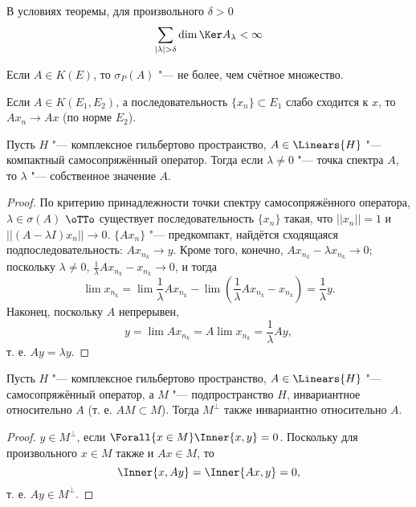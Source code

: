 \documentclass[main]{subfiles}
\begin{document}
\begin{corollary}
  В условиях теоремы, для произвольного \( \delta > 0 \)
  \[
    \sum_{|\lambda| > \delta} \dim \Ker A_\lambda < \infty
  \]
\end{corollary}

\begin{corollary}
  Если \( A \in K(E) \), то \( \sigma_P(A) \) "---
  не более, чем счётное множество.
\end{corollary}

\begin{problem}
  Если \( A \in K(E_1, E_2) \),
  а последовательность \( \{ x_n \} \subset E_1 \)
  слабо сходится к \( x \),
  то \( A x_n \to A x \) (по норме \( E_2 \)).
\end{problem}


\begin{lemma}
  Пусть \( H \) "--- комплексное гильбертово пространство,
  \( A \in \Linears{H} \) "--- компактный самосопряжённый оператор.
  Тогда если \( \lambda \ne 0 \) "--- точка спектра \( A \),
  то \( \lambda \) "--- собственное значение \( A \).
\end{lemma}
\begin{proof}
  По критерию принадлежности точки спектру самосопряжённого оператора,
  \( \lambda \in \sigma(A) \) \(\oTTo\) 
  существует последовательность \( \{ x_n \} \)
  такая, что \( ||x_n|| = 1 \) и
  \( ||(A - \lambda I) x_n|| \to 0 \).
  \( \{ A x_n \} \) "--- предкомпакт,
  найдётся сходящаяся подпоследовательность:
  \( A x_{n_k} \to y \).
  Кроме того, конечно,
  \( A x_{n_k} - \lambda x_{n_k} \to 0 \);
  поскольку \( \lambda \ne 0 \),
  \( \frac1\lambda A x_{n_k} - x_{n_k} \to 0 \),
  и тогда
  \[
    \lim x_{n_k} = \lim \frac1\lambda A x_{n_k} - \lim (\frac1\lambda A x_{n_k} - x_{n_k}) =
    \frac1\lambda y.
  \]
  Наконец, поскольку \( A \) непрерывен,
  \[
    y = \lim A x_{n_k} = A \lim x_{n_k} = \frac1\lambda A y,
  \]
  т. е. \( A y = \lambda y \).
\end{proof}

\begin{lemma}%
  Пусть \( H \) "--- комплексное гильбертово пространство,
  \( A \in \Linears{H} \) "--- самосопряжённый оператор,
  а \( M \) "--- подпространство \( H \),
  инвариантное относительно \( A \)
  (т. е. \( AM \subset M \)).
  Тогда \( M^\perp \) также инвариантно
  относительно \( A \).
\end{lemma}
\begin{proof}
  \( y \in M^\perp \), если \( \Forall{x \in M}
  \Inner{x, y} = 0 \).
  Поскольку для произвольного \( x \in M \)
  также и \( Ax \in M \), то
  \[
    \Inner{x, Ay} = \Inner{Ax, y} = 0,
  \]
  т. е. \( Ay \in M^\perp \).
\end{proof}
\end{document}
